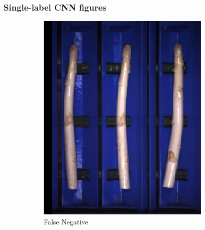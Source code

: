 \newpage

\subsubsection{Single-label CNN figures}
\label{subsec:AdditionalSingleLabelCNN}

\begin{figure}[!htb]
	\centering
	\begin{subfigure}{0.3\textwidth}
		\includegraphics[width=0.9\linewidth]{Figures/appendix/violet_falsenegative_01.png}
		\vspace{-5pt}
		\caption{False Negative}
	\end{subfigure}
	\begin{subfigure}{0.3\textwidth}

\end{subfigure}
\end{figure}
